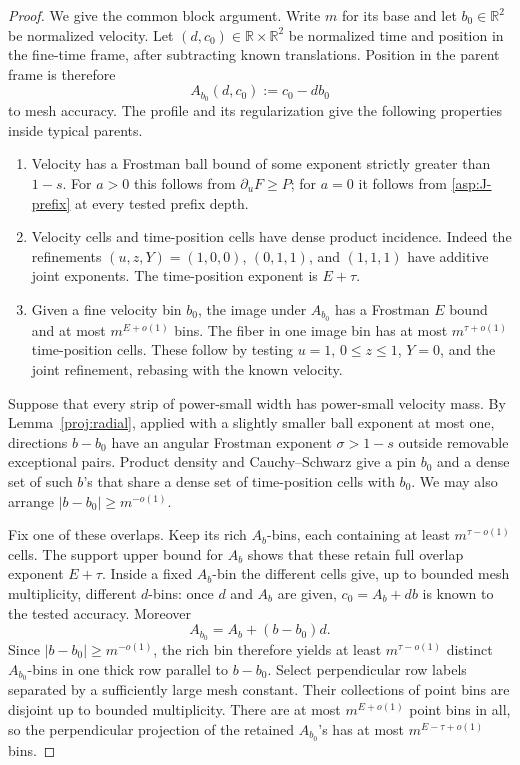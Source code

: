 \begin{proof}
We give the common block argument. Write \(m\) for its base and let
\(b_0\in\mathbb R^2\) be normalized velocity. Let
\((d,c_0)\in\mathbb R\times\mathbb R^2\) be normalized time and position
in the fine-time frame, after subtracting known translations. Position in the
parent frame is therefore
\[
A_{b_0}(d,c_0):=c_0-d b_0
\]
to mesh accuracy. The profile and its regularization give the following
properties inside typical parents.
\begin{enumerate}[label=(\roman*)]
\item Velocity has a Frostman ball bound of some exponent strictly greater
than \(1-s\). For \(a>0\) this follows from \(\partial_uF\ge P\); for
\(a=0\) it follows from \eqref{asp:J-prefix} at every tested prefix depth.
\item Velocity cells and time-position cells have dense product incidence.
Indeed the refinements \((u,z,Y)=(1,0,0)\), \((0,1,1)\), and
\((1,1,1)\) have additive joint exponents. The time-position exponent is
\(E+\tau\).
\item Given a fine velocity bin \(b_0\), the image under \(A_{b_0}\) has
a Frostman \(E\) bound and at most \(m^{E+o(1)}\) bins. The fiber in one
image bin has at most \(m^{\tau+o(1)}\) time-position cells. These follow
by testing \(u=1\), \(0\le z\le1\), \(Y=0\), and the joint refinement,
rebasing with the known velocity.
\end{enumerate}

Suppose that every strip of power-small width has power-small velocity mass.
By Lemma~\ref{proj:radial}, applied with a slightly smaller ball exponent
at most one, directions \(b-b_0\) have an angular Frostman exponent
\(\sigma>1-s\) outside removable exceptional pairs. Product density and
Cauchy--Schwarz give a pin \(b_0\) and a dense set of such \(b\)'s that
share a dense set of time-position cells with \(b_0\). We may also arrange
\(|b-b_0|\ge m^{-o(1)}\).

Fix one of these overlaps. Keep its rich \(A_b\)-bins, each containing at
least \(m^{\tau-o(1)}\) cells. The support upper bound for \(A_b\) shows
that these retain full overlap exponent \(E+\tau\). Inside a fixed
\(A_b\)-bin the different cells give, up to bounded mesh multiplicity,
different \(d\)-bins: once \(d\) and \(A_b\) are given, \(c_0=A_b+db\)
is known to the tested accuracy. Moreover
\[
A_{b_0}=A_b+(b-b_0)d.
\]
Since \(|b-b_0|\ge m^{-o(1)}\), the rich bin therefore yields at least
\(m^{\tau-o(1)}\) distinct \(A_{b_0}\)-bins in one thick row parallel
to \(b-b_0\). Select perpendicular row labels separated by a sufficiently
large mesh constant. Their collections of point bins are disjoint up to
bounded multiplicity. There are at most \(m^{E+o(1)}\) point bins in all,
so the perpendicular projection of the retained \(A_{b_0}\)'s has at most
\(m^{E-\tau+o(1)}\) bins.


\end{proof}
